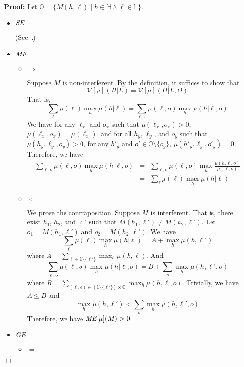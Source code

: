 \documentclass{llncs}
\newenvironment{proof}{\noindent\rm{\bf Proof:}}{\hbox{$\Box$}\vspace*{0.2\baselineskip}}
\newcommand{\aset}[1]{\{{#1}\}}
\begin{document}
\begin{proof}
  Let $\mathbb{O}=\aset{M(h,\ell)\mid h\in\mathbb{H}\wedge
  \ell\in\mathbb{L}}$.
\begin{itemize}
\item ${\it SE}$

\hspace{0.5em}
  (See~\cite{clark05}.)
\vspace{0.5em}

\item ${\it ME}$
\begin{itemize}
\item $\Rightarrow$

  Suppose $M$ is non-interferent.  By the definition, it suffices to
  show that
\[
\mathcal{V}[\mu](H|L)=\mathcal{V}[\mu](H|L,O)
\]
That is,
\[
\sum_\ell\mu(\ell)\max_h \mu(h|\ell) =
\sum_{\ell,o}\mu(\ell,o)\max_h\mu(h|\ell,o)
\]
We have for any $\ell_x$ and $o_x$ such that $\mu(\ell_x,o_x)>0$,
$\mu(\ell_x,o_x)=\mu(\ell_x)$, and 
for all $h_y$, $\ell_y$, and $o_y$ such that
$\mu(h_y,\ell_y,o_y)>0$, for any $h'_y$ and
$o'\in\mathbb{O}\setminus\aset{o_y}$, $\mu(h'_y,\ell_y,o'_y)=0$.
 Therefore, we
have
\[
\begin{array}{rcl}
  \sum_{\ell,o}\mu(\ell,o)\max_h\mu(h|\ell,o)&=&\sum_{\ell,o}\mu(\ell,o)\max_h\frac{\mu(h,\ell,o)}{\mu(\ell,o)}\\
&=&\sum_{\ell}\mu(\ell)\max_h\mu(h|\ell)
\end{array}
\]
\item $\Leftarrow$

  We prove the contraposition.  Suppose $M$ is interferent.  That is,
  there exist $h_1$, $h_2$, and $\ell'$ such that
  $M(h_1,\ell')\not=M(h_2,\ell')$.  Let $o_1=M(h_1,\ell')$ and
  $o_2=M(h_2,\ell')$.  We have
\[
  \sum_{\ell}\mu(\ell)\max_h\mu(h|\ell)=A+\max_h\mu(h,\ell')
\]
where
$A=\sum_{\ell\in\mathbb{L}\setminus\aset{\ell'}}\max_h\mu(h,\ell)$.
And,
\[
  \sum_{\ell,o}\mu(\ell,o)\max_h\mu(h|\ell,o)=B+\sum_o\max_h\mu(h,\ell',o)
\]
where
$B=\sum_{(\ell,o)\in(\mathbb{L}\setminus\aset{\ell'})\times\mathbb{O}}\max_h\mu(h,\ell,o)$.   
Trivially, we have $A\le B$ and
\[
\max_h\mu(h,\ell')<\sum_o\max_h\mu(h,\ell',o)
\]
Therefore, we have ${\it ME}[\mu](M)>0$.
\end{itemize}

\item ${\it GE}$
\begin{itemize}
\item $\Rightarrow$


\end{itemize}
\end{itemize}
\end{proof}
\end{document}
